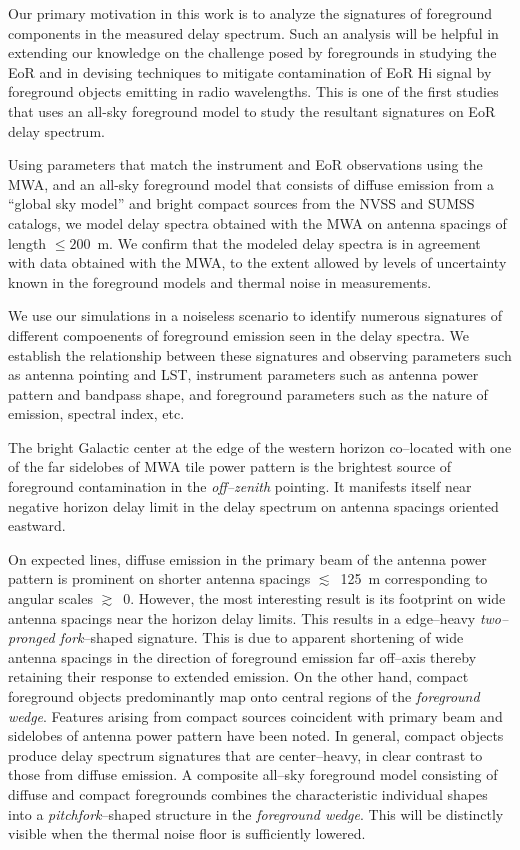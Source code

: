 \documentclass[preprint2,iop,numberedappendix]{emulateapj}
\begin{document}
Our primary motivation in this work is to analyze the signatures of foreground components in the measured delay spectrum. Such an analysis will be helpful in extending our knowledge on the challenge posed by foregrounds in studying the EoR and in devising techniques to mitigate contamination of EoR H{\sc i} signal by foreground objects emitting in radio wavelengths. This is one of the first studies that uses an all-sky foreground model to study the resultant signatures on EoR delay spectrum.

Using parameters that match the instrument and EoR observations using the MWA, and an all-sky foreground model that consists of diffuse emission from a ``global sky model'' and bright compact sources from the NVSS and SUMSS catalogs, we model delay spectra obtained with the MWA on antenna spacings of length $\le 200$~m. We confirm that the modeled delay spectra is in agreement with data obtained with the MWA, to the extent allowed by levels of uncertainty known in the foreground models and thermal noise in measurements. 

We use our simulations in a noiseless scenario to identify numerous signatures of different compoenents of foreground emission seen in the delay spectra. We establish the relationship between these signatures and observing parameters such as antenna pointing and LST, instrument parameters such as antenna power pattern and bandpass shape, and foreground parameters such as the nature of emission, spectral index, etc. 

The bright Galactic center at the edge of the western horizon co--located with one of the far sidelobes of MWA tile power pattern is the brightest source of foreground contamination in the {\it off--zenith} pointing. It manifests itself near negative horizon delay limit in the delay spectrum on antenna spacings oriented eastward. 

On expected lines, diffuse emission in the primary beam of the antenna power pattern is prominent on shorter antenna spacings $\lesssim$~125~m corresponding to angular scales $\gtrsim$~0. However, the most interesting result is its footprint on wide antenna spacings near the horizon delay limits. This results in a edge--heavy {\it two--pronged fork}--shaped signature. This is due to apparent shortening of wide antenna spacings in the direction of foreground emission far off--axis thereby retaining their response to extended emission. On the other hand, compact foreground objects predominantly map onto central regions of the {\it foreground wedge}. Features arising from compact sources coincident with primary beam and sidelobes of antenna power pattern have been noted. In general, compact objects produce delay spectrum signatures that are center--heavy, in clear contrast to those from diffuse emission. A composite all--sky foreground model consisting of diffuse and compact foregrounds combines the characteristic individual shapes into a {\it pitchfork}--shaped structure in the {\it foreground wedge}. This will be distinctly visible when the thermal noise floor is sufficiently lowered. 
\end{document}
